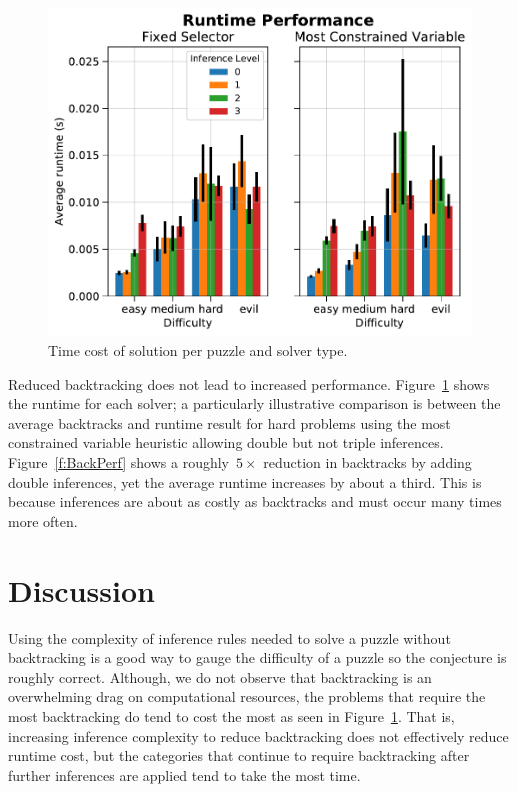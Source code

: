 \documentclass[12pt]{article}
\begin{document}
\begin{figure}[!h]
	\centering
	\includegraphics[width=\textwidth]{TimePerform}
	\caption{Time cost of solution per puzzle and solver type.}	
	\label{f:TimePerf}
\end{figure}

Reduced backtracking does not lead to increased performance.
Figure~\ref{f:TimePerf} shows the runtime for each solver; a particularly illustrative comparison is between the average backtracks and runtime result for hard problems using the most constrained variable heuristic allowing double but not triple inferences.
Figure~\ref{f:BackPerf} shows a roughly~$5\times$ reduction in backtracks by adding double inferences, yet the average runtime increases by about a third.
This is because inferences are about as costly as backtracks and must occur many times more often.

\section{Discussion}

Using the complexity of inference rules needed to solve a puzzle without backtracking is a good way to gauge the difficulty of a puzzle so the conjecture is roughly correct. 
Although, we do not observe that backtracking is an overwhelming drag on computational resources, the problems that require the most backtracking do tend to cost the most as seen in Figure~\ref{f:TimePerf}.
That is, increasing inference complexity to reduce backtracking does not effectively reduce runtime cost, but the categories that continue to require backtracking after further inferences are applied tend to take the most time.
\end{document}
